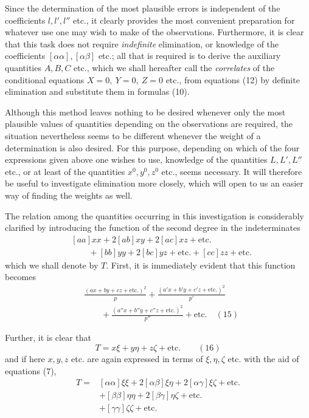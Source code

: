Since the determination of the most plausible errors is independent of the coefficients \(l,l',l''\) etc., it clearly provides the most convenient preparation for whatever use one may wish to make of the observations. Furthermore, it is clear that this task does not require \textit{indefinite} elimination, or knowledge of the coefficients \([\alpha\alpha],[\alpha\beta]\) etc.; all that is required is to derive the auxiliary quantities \(A,B,C\) etc., which we shall hereafter call the \textit{correlates} of the conditional equations \(X=0,\ Y=0,\ Z=0\) etc., from equations (12) by definite elimination and substitute them in formulas (10).

Although this method leaves nothing to be desired whenever only the most plausible values of quantities depending on the observations are required, the situation nevertheless seems to be different whenever the weight of a determination is also desired. For this purpose, depending on which of the four expressions given above one wishes to use, knowledge of the quantities \(L,L',L''\) etc., or at least of the quantities \(x^0,y^0,z^0\) etc., seems necessary. It will therefore be useful to investigate elimination more closely, which will open to us an easier way of finding the weights as well.

The relation among the quantities occurring in this investigation is considerably clarified by introducing the function of the second degree in the indeterminates
\[
\begin{aligned}&[aa]xx+2[ab]xy+2[ac]xz+\text{etc.}\\&\qquad+[bb]yy+2[bc]yz+\text{etc.}+[cc]zz+\text{etc.}\end{aligned}
\]
which we shall denote by \(T\). First, it is immediately evident that this function becomes
\[
\begin{aligned}&\frac{(ax+by+cz+\text{etc.})^2}{p}+\frac{(a'x+b'y+c'z+\text{etc.})^2}{p'}\\&\qquad+\frac{(a''x+b''y+c''z+\text{etc.})^2}{p''}+\text{etc.}\quad(15)\end{aligned}
\]

Further, it is clear that
\[
T=x\xi+y\eta+z\zeta+\text{etc.}\qquad(16)
\]
and if here \(x,y,z\) etc. are again expressed in terms of \(\xi,\eta,\zeta\) etc. with the aid of equations (7),
\[
\begin{aligned}
T={}&[\alpha\alpha]\xi\xi+2[\alpha\beta]\xi\eta+2[\alpha\gamma]\xi\zeta+\text{etc.}\\&+[\beta\beta]\eta\eta+2[\beta\gamma]\eta\zeta+\text{etc.}\\
&+[\gamma\gamma]\zeta\zeta+\text{etc.}
\end{aligned}
\]

